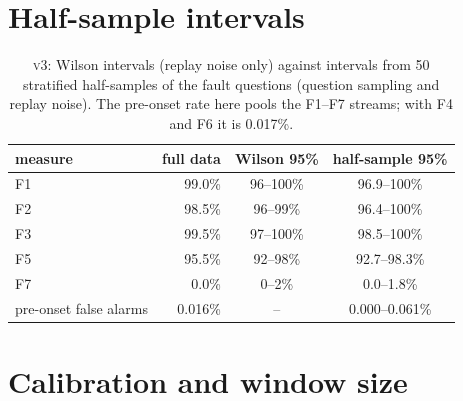\documentclass{article}
\newcommand{\vthree}{\textsc{v3}}
\begin{document}
\section{Half-sample intervals}
\label{app:half}
\begin{table}[h]
  \centering\small
  \caption{\vthree{}: Wilson intervals (replay noise only) against intervals from 50
  stratified half-samples of the fault questions (question sampling and replay
  noise). The pre-onset rate here pools the F1--F7 streams; with F4 and F6 it is
  0.017\%.}
  \begin{tabular}{lrcc}
    \toprule
    measure & full data & Wilson 95\% & half-sample 95\% \\
    \midrule
    F1 & 99.0\% & 96--100\% & 96.9--100\% \\
    F2 & 98.5\% & 96--99\% & 96.4--100\% \\
    F3 & 99.5\% & 97--100\% & 98.5--100\% \\
    F5 & 95.5\% & 92--98\% & 92.7--98.3\% \\
    F7 & 0.0\% & 0--2\% & 0.0--1.8\% \\
    pre-onset false alarms & 0.016\% & -- & 0.000--0.061\% \\
    \bottomrule
  \end{tabular}
\end{table}

\section{Calibration and window size}
\label{app:sens}
\begin{table}[h]
  \centering\small
  \caption{\vthree{} recalibrated on a share of the calibration questions (ranges over
  three draws per share) and at three window sizes. Runs alarmed
  out of 200.}
  \setlength{\tabcolsep}{4pt}
\end{table}
\end{document}
